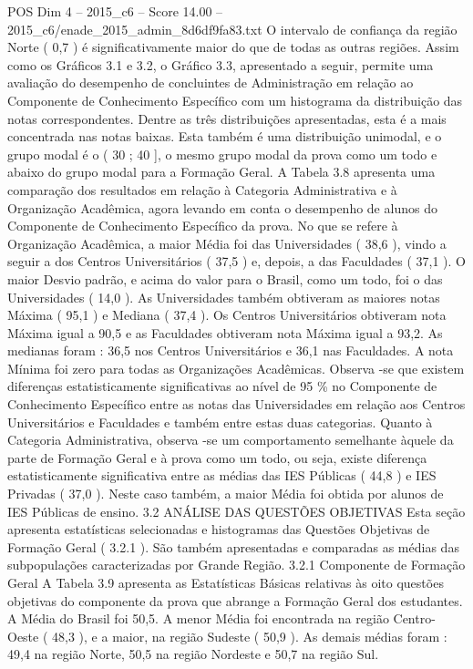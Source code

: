 \begin{textsample}{POS Dim 4 – 2015\_c6 – Score 14.00 – 2015\_c6/enade\_2015\_admin\_8d6df9fa83.txt}
O intervalo de confiança da região Norte ( 0,7 ) é significativamente maior do que de todas as outras regiões.
Assim como os Gráficos 3.1 e 3.2, o Gráfico 3.3, apresentado a seguir, permite uma avaliação do desempenho de concluintes de Administração em relação ao Componente de Conhecimento Específico com um histograma da distribuição das notas correspondentes.
Dentre as três distribuições apresentadas, esta é a mais concentrada nas notas baixas.
Esta também é uma distribuição unimodal, e o grupo modal é o ( 30 ; 40 ], o mesmo grupo modal da prova como um todo e abaixo do grupo modal para a Formação Geral.
A Tabela 3.8 apresenta uma comparação dos resultados em relação à Categoria Administrativa e à Organização Acadêmica, agora levando em conta o desempenho de alunos do Componente de Conhecimento Específico da prova.
No que se refere à Organização Acadêmica, a maior Média foi das Universidades ( 38,6 ), vindo a seguir a dos Centros Universitários ( 37,5 ) e, depois, a das Faculdades ( 37,1 ).
O maior Desvio padrão, e acima do valor para o Brasil, como um todo, foi o das Universidades ( 14,0 ).
As Universidades também obtiveram as maiores notas Máxima ( 95,1 ) e Mediana ( 37,4 ).
Os Centros Universitários obtiveram nota Máxima igual a 90,5 e as Faculdades obtiveram nota Máxima igual a 93,2.
As medianas foram : 36,5 nos Centros Universitários e 36,1 nas Faculdades.
A nota Mínima foi zero para todas as Organizações Acadêmicas.
Observa -se que existem diferenças estatisticamente significativas ao nível de 95 \% no Componente de Conhecimento Específico entre as notas das Universidades em relação aos Centros Universitários e Faculdades e também entre estas duas categorias.
Quanto à Categoria Administrativa, observa -se um comportamento semelhante àquele da parte de Formação Geral e à prova como um todo, ou seja, existe diferença estatisticamente significativa entre as médias das IES Públicas ( 44,8 ) e IES Privadas ( 37,0 ).
Neste caso também, a maior Média foi obtida por alunos de IES Públicas de ensino. 3.2 ANÁLISE DAS QUESTÕES OBJETIVAS Esta seção apresenta estatísticas selecionadas e histogramas das Questões Objetivas de Formação Geral ( 3.2.1 ).
São também apresentadas e comparadas as médias das subpopulações caracterizadas por Grande Região. 3.2.1 Componente de Formação Geral A Tabela 3.9 apresenta as Estatísticas Básicas relativas às oito questões objetivas do componente da prova que abrange a Formação Geral dos estudantes.
A Média do Brasil foi 50,5.
A menor Média foi encontrada na região Centro-Oeste ( 48,3 ), e a maior, na região Sudeste ( 50,9 ).
As demais médias foram : 49,4 na região Norte, 50,5 na região Nordeste e 50,7 na região Sul.

\end{textsample}
